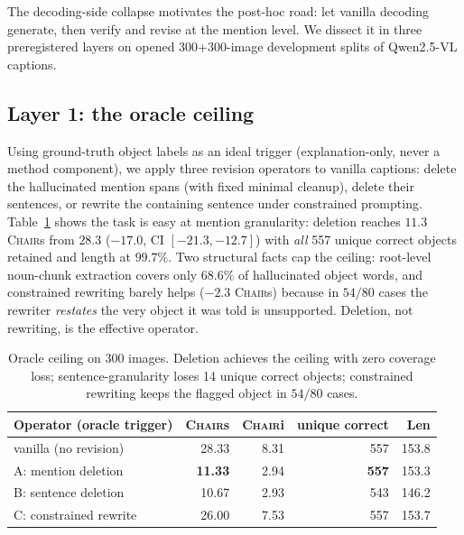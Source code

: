 \documentclass[11pt]{article}
\newcommand{\chair}{\textsc{Chair}}
\begin{document}
The decoding-side collapse motivates the post-hoc road: let vanilla decoding generate, then verify and revise at the mention level. We dissect it in three preregistered layers on opened 300+300-image development splits of Qwen2.5-VL captions.

\subsection{Layer 1: the oracle ceiling}
Using ground-truth object labels as an ideal trigger (explanation-only, never a method component), we apply three revision operators to vanilla captions: delete the hallucinated mention spans (with fixed minimal cleanup), delete their sentences, or rewrite the containing sentence under constrained prompting. Table~\ref{tab:oracle} shows the task is easy at mention granularity: deletion reaches $11.3$ \chair{s} from $28.3$ ($-17.0$, CI $[-21.3,-12.7]$) with \emph{all} 557 unique correct objects retained and length at $99.7\%$. Two structural facts cap the ceiling: root-level noun-chunk extraction covers only $68.6\%$ of hallucinated object words, and constrained rewriting barely helps ($-2.3$ \chair{s}) because in $54/80$ cases the rewriter \emph{restates} the very object it was told is unsupported. Deletion, not rewriting, is the effective operator.

\begin{table}[t]
\centering\small
\begin{tabular}{lrrrr}
\toprule
Operator (oracle trigger) & \chair{s} & \chair{i} & unique correct & Len \\
\midrule
vanilla (no revision) & 28.33 & 8.31 & 557 & 153.8 \\
A: mention deletion & \textbf{11.33} & 2.94 & \textbf{557} & 153.3 \\
B: sentence deletion & 10.67 & 2.93 & 543 & 146.2 \\
C: constrained rewrite & 26.00 & 7.53 & 557 & 153.7 \\
\bottomrule
\end{tabular}
\caption{Oracle ceiling on 300 images. Deletion achieves the ceiling with zero coverage loss; sentence-granularity loses 14 unique correct objects; constrained rewriting keeps the flagged object in $54/80$ cases.}
\label{tab:oracle}
\end{table}
\end{document}
